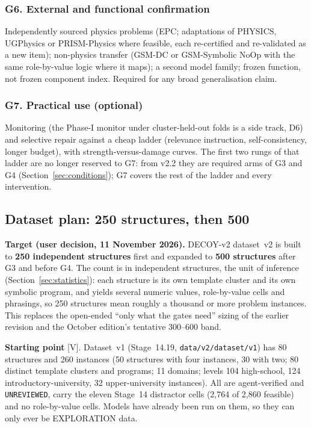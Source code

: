 \documentclass[10pt,a4paper]{article}
\newcommand{\tg}[1]{\textsc{[#1]}}
\begin{document}
\subsubsection*{G6. External and functional confirmation}
Independently sourced physics problems (EPC; adaptations of PHYSICS, UGPhysics or PRISM-Physics where feasible,
each re-certified and re-validated as a new item); non-physics transfer (GSM-DC or GSM-Symbolic NoOp with the same
role-by-value logic where it maps); a second model family; frozen function, not frozen component index. Required
for any broad generalisation claim.

\subsubsection*{G7. Practical use (optional)}
Monitoring (the Phase-I monitor under cluster-held-out folds is a side track, D6) and selective repair against a
cheap ladder (relevance instruction, self-consistency, longer budget), with strength-versus-damage curves. The first two
rungs of that ladder are no longer reserved to G7: from v2.2 they are required arms of G3 and G4 (Section~\ref{sec:conditions});
G7 covers the rest of the ladder and every intervention.

\subsection{Dataset plan: 250 structures, then 500}
\label{sec:datasetplan}

\textbf{Target (user decision, 11 November 2026).} DECOY-v2 dataset~v2 is built to \textbf{250 independent
structures} first and expanded to \textbf{500 structures} after G3 and before G4. The count is in independent
structures, the unit of inference (Section~\ref{sec:statistics}): each structure is its own template cluster and
its own symbolic program, and yields several numeric values, role-by-value cells and phrasings, so 250 structures
mean roughly a thousand or more problem instances. This replaces the open-ended ``only what the gates need'' sizing
of the earlier revision and the October edition's tentative 300--600 band.

\textbf{Starting point} \tg{V}. Dataset~v1 (Stage~14.19, \texttt{data/v2/dataset/v1}) has 80 structures and 260
instances (50 structures with four instances, 30 with two; 80 distinct template clusters and programs; 11 domains;
levels 104 high-school, 124 introductory-university, 32 upper-university instances). All are agent-verified and
\texttt{UNREVIEWED}, carry the eleven Stage~14 distractor cells (2,764 of 2,860 feasible) and no role-by-value
cells. Models have already been run on them, so they can only ever be EXPLORATION data.
\end{document}
